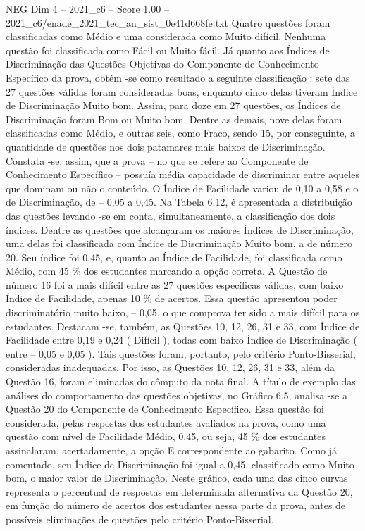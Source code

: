 \begin{textsample}{NEG Dim 4 – 2021\_c6 – Score 1.00 – 2021\_c6/enade\_2021\_tec\_an\_sist\_0e41d668fe.txt}
Quatro questões foram classificadas como Médio e uma considerada como Muito difícil.
Nenhuma questão foi classificada como Fácil ou Muito fácil.
Já quanto aos Índices de Discriminação das Questões Objetivas do Componente de Conhecimento Específico da prova, obtém -se como resultado a seguinte classificação : sete das 27 questões válidas foram consideradas boas, enquanto cinco delas tiveram Índice de Discriminação Muito bom.
Assim, para doze em 27 questões, os Índices de Discriminação foram Bom ou Muito bom.
Dentre as demais, nove delas foram classificadas como Médio, e outras seis, como Fraco, sendo 15, por conseguinte, a quantidade de questões nos dois patamares mais baixos de Discriminação.
Constata -se, assim, que a prova – no que se refere ao Componente de Conhecimento Específico – possuía média capacidade de discriminar entre aqueles que dominam ou não o conteúdo.
O Índice de Facilidade variou de 0,10 a 0,58 e o de Discriminação, de – 0,05 a 0,45.
Na Tabela 6.12, é apresentada a distribuição das questões levando -se em conta, simultaneamente, a classificação dos dois índices.
Dentre as questões que alcançaram os maiores Índices de Discriminação, uma delas foi classificada com Índice de Discriminação Muito bom, a de número 20.
Seu índice foi 0,45, e, quanto ao Índice de Facilidade, foi classificada como Médio, com 45 \% dos estudantes marcando a opção correta.
A Questão de número 16 foi a mais difícil entre as 27 questões específicas válidas, com baixo Índice de Facilidade, apenas 10 \% de acertos.
Essa questão apresentou poder discriminatório muito baixo, – 0,05, o que comprova ter sido a mais difícil para os estudantes.
Destacam -se, também, as Questões 10, 12, 26, 31 e 33, com Índice de Facilidade entre 0,19 e 0,24 ( Difícil ), todas com baixo Índice de Discriminação ( entre – 0,05 e 0,05 ).
Tais questões foram, portanto, pelo critério Ponto-Bisserial, consideradas inadequadas.
Por isso, as Questões 10, 12, 26, 31 e 33, além da Questão 16, foram eliminadas do cômputo da nota final.
A título de exemplo das análises do comportamento das questões objetivas, no Gráfico 6.5, analisa -se a Questão 20 do Componente de Conhecimento Específico.
Essa questão foi considerada, pelas respostas dos estudantes avaliados na prova, como uma questão com nível de Facilidade Médio, 0,45, ou seja, 45 \% dos estudantes assinalaram, acertadamente, a opção E correspondente ao gabarito.
Como já comentado, seu Índice de Discriminação foi igual a 0,45, classificado como Muito bom, o maior valor de Discriminação.
Neste gráfico, cada uma das cinco curvas representa o percentual de respostas em determinada alternativa da Questão 20, em função do número de acertos dos estudantes nessa parte da prova, antes de possíveis eliminações de questões pelo critério Ponto-Bisserial.

\end{textsample}
